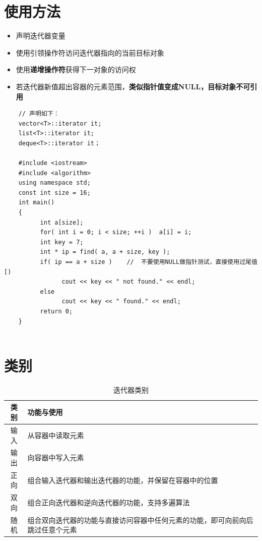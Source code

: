 \documentclass[UTF8,a4paper,12pt]{ctexbook}
\begin{document}
	

	\section{使用方法}
		\begin{itemize}
			\item 声明迭代器变量
			
			\item 使用引领操作符访问迭代器指向的当前目标对象
			
			\item 使用\textbf{递增操作符}获得下一对象的访问权
			
			\item 若迭代器新值超出容器的元素范围，\textbf{类似指针值变成NULL，目标对象不可引用}
		\end{itemize}
		
		\begin{lstlisting}
	// 声明如下：
	vector<T>::iterator it;
	list<T>::iterator it;
	deque<T>::iterator it；
	
	#include <iostream>
	#include <algorithm>
	using namespace std;
	const int size = 16;
	int main()
	{
		  int a[size];
		  for( int i = 0; i < size; ++i )  a[i] = i;
		  int key = 7;
		  int * ip = find( a, a + size, key );
		  if( ip == a + size )    //  不要使用NULL做指针测试，直接使用过尾值 [)
			    cout << key << " not found." << endl;
		  else
			    cout << key << " found." << endl;
		  return 0;
	}
	
		\end{lstlisting}
		
	\section{类别}
		\begin{table}[H]
			\centering
			\caption{迭代器类别}
			\begin{tabular}{c|m{15cm}}
				\hline 
				类别 & 功能与使用\\
				\hline
				输入	& 从容器中读取元素\\
				输出  & 向容器中写入元素\\
				正向  & 组合输入迭代器和输出迭代器的功能，并保留在容器中的位置\\
				双向  & 组合正向迭代器和逆向迭代器的功能，支持多遍算法\\
				随机  & 组合双向迭代器的功能与直接访问容器中任何元素的功能，即可向前向后跳过任意个元素\\
				\hline
				\end{tabular}
			\end{table}	
			
\end{document}
